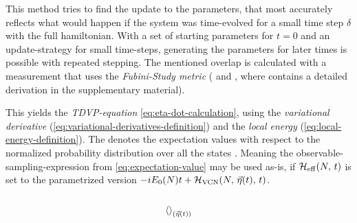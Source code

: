 This method tries to find the update to the parameters, that most accurately reflects what would happen if the system was time-evolved for a small time step $\delta$ with the full hamiltonian.
With a set of starting parameters for $t=0$ and an update-strategy for small time-steps, generating the parameters for later times is possible with repeated stepping.
The mentioned overlap is calculated with a measurement that uses the \emph{Fubini-Study metric} (\cite{variationalClassicalNetworksPaper} and \cite{probabilitySamplingRequirementVCN}, where \cite{probabilitySamplingRequirementVCN} contains a detailed derivation in the supplementary material).

This yields the \emph{TDVP-equation} \autoref{eq:eta-dot-calculation}, using the \emph{variational derivative} (\autoref{eq:variational-derivatives-definition}) and the \emph{local energy} (\autoref{eq:local-energy-definition}).
The \etaExpectationVal{\ast} denotes the expectation values with respect to the normalized probability distribution over all the states  \cite{probabilitySamplingRequirementVCN}.
Meaning the observable-sampling-expression from \autoref{eq:expectation-value} may be used as-is, if ${\mathcal{H}_\text{eff}}^{}({N},\,t)$ is set to the parametrized version $-i E_0(N) t + {\mathcal{H}_\text{VCN}}({N},\,{\vec{\eta}(t)},\,t)$.

\begin{equation}
    \label{eq:eta-dot-calculation}
\end{equation}

\begin{equation}
    \label{eq:variational-derivatives-definition}
    {\left\langle {}\right\rangle}_{(\vec{\eta}(t))}
\end{equation}

\begin{equation}
    \label{eq:local-energy-definition}
\end{equation}

